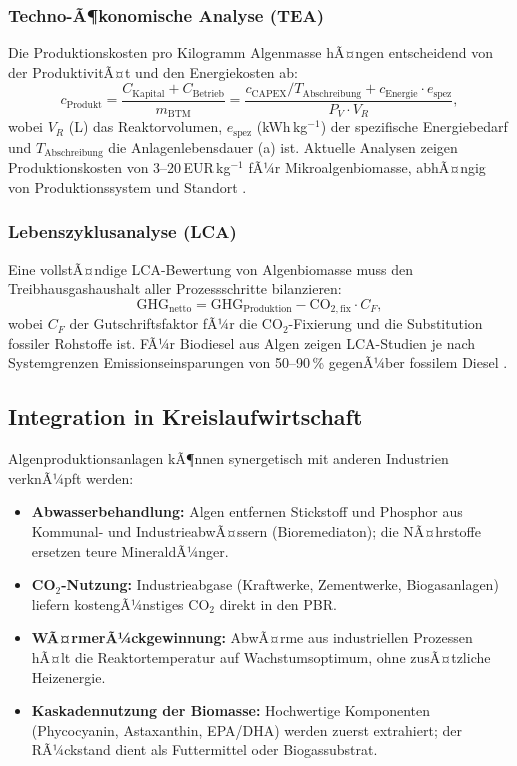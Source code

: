 ﻿\documentclass[a4paper,12pt]{article}
\theoremstyle{definition}
\begin{document}
\subsubsection{Techno-Ã¶konomische Analyse (TEA)}

Die Produktionskosten pro Kilogramm Algenmasse hÃ¤ngen entscheidend von der
ProduktivitÃ¤t und den Energiekosten ab:
\[
	c_\mathrm{Produkt}
	= \frac{C_\mathrm{Kapital} + C_\mathrm{Betrieb}}{m_\mathrm{BTM}}
	= \frac{c_\mathrm{CAPEX}/T_\mathrm{Abschreibung} + c_\mathrm{Energie} \cdot e_\mathrm{spez}}{P_V \cdot V_R},
\]
wobei $V_R$ (L) das Reaktorvolumen, $e_\mathrm{spez}$ (kWh\,kg$^{-1}$) der spezifische
Energiebedarf und $T_\mathrm{Abschreibung}$ die Anlagenlebensdauer (a) ist.
Aktuelle Analysen zeigen Produktionskosten von 3--20\,EUR\,kg$^{-1}$ fÃ¼r
Mikroalgenbiomasse, abhÃ¤ngig von Produktionssystem und Standort \cite{chisti2007}.

\subsubsection{Lebenszyklusanalyse (LCA)}

Eine vollstÃ¤ndige LCA-Bewertung von Algenbiomasse muss den Treibhausgashaushalt
aller Prozessschritte bilanzieren:
\[
	\mathrm{GHG}_\mathrm{netto} = \mathrm{GHG}_\mathrm{Produktion}
	- \mathrm{CO}_{2,\mathrm{fix}} \cdot C_F,
\]
wobei $C_F$ der Gutschriftsfaktor fÃ¼r die CO$_2$-Fixierung und die Substitution
fossiler Rohstoffe ist. FÃ¼r Biodiesel aus Algen zeigen LCA-Studien je nach
Systemgrenzen Emissionseinsparungen von 50--90\,\% gegenÃ¼ber fossilem Diesel
\cite{clarens2010}.

\subsection{Integration in Kreislaufwirtschaft}

Algenproduktionsanlagen kÃ¶nnen synergetisch mit anderen Industrien verknÃ¼pft werden:

\begin{itemize}
	\item \textbf{Abwasserbehandlung:} Algen entfernen Stickstoff und Phosphor
	      aus Kommunal- und IndustrieabwÃ¤ssern (Bioremediaton); die NÃ¤hrstoffe
	      ersetzen teure MineraldÃ¼nger.
	\item \textbf{CO$_2$-Nutzung:} Industrieabgase (Kraftwerke, Zementwerke,
	      Biogasanlagen) liefern kostengÃ¼nstiges CO$_2$ direkt in den PBR.
	\item \textbf{WÃ¤rmerÃ¼ckgewinnung:} AbwÃ¤rme aus industriellen Prozessen
	      hÃ¤lt die Reaktortemperatur auf Wachstumsoptimum, ohne zusÃ¤tzliche
	      Heizenergie.
	\item \textbf{Kaskadennutzung der Biomasse:} Hochwertige Komponenten
	      (Phycocyanin, Astaxanthin, EPA/DHA) werden zuerst extrahiert;
	      der RÃ¼ckstand dient als Futtermittel oder Biogassubstrat.
\end{itemize}
\end{document}

